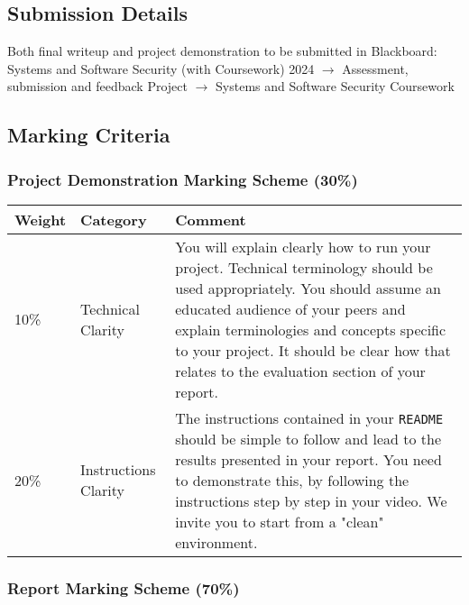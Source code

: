 \documentclass{article}
\newcommand\cwyear[0]{2024}
\begin{document}
\subsection*{Submission Details}

Both final writeup and project
demonstration to be submitted in Blackboard: Systems and Software
Security (with Coursework) \cwyear{} $\rightarrow$
Assessment, submission and feedback Project
$\rightarrow$ Systems and Software Security Coursework

\subsection*{Marking Criteria}

\subsubsection*{Project Demonstration Marking Scheme (30\%)}

\begin{tabularx}{\linewidth}{llX}
  \toprule
  Weight & Category & Comment \\
  \midrule
  10\% & Technical Clarity & You will explain clearly how to run your
                             project. Technical terminology should be used appropriately. You should
                             assume an educated audience of your peers and explain terminologies and
                             concepts specific to your project. It should be clear how that relates
                             to the evaluation section of your report. \\
  20\% & Instructions Clarity & The instructions contained in your \texttt{README}
                                should be simple to follow and lead to the results presented in your
                                report. You need to demonstrate this, by following the instructions step
                                by step in your video. We invite you to start from a "clean"
                                environment. \\
  \bottomrule
\end{tabularx}

\subsubsection*{Report Marking Scheme (70\%)}
\end{document}
